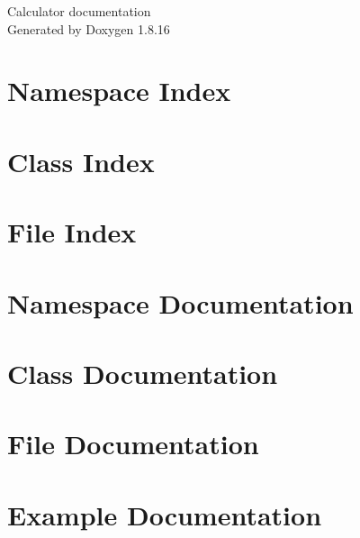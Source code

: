 \let\mypdfximage\pdfximage\def\pdfximage{\immediate\mypdfximage}\documentclass[twoside]{book}
\newcommand{\+}{\discretionary{\mbox{\scriptsize$\hookleftarrow$}}{}{}}
\newcommand{\clearemptydoublepage}{%
  \newpage{\pagestyle{empty}\cleardoublepage}%
}
\begin{document}
\hypersetup{pageanchor=false,
             bookmarksnumbered=true,
             pdfencoding=unicode
            }
\begin{titlepage}
\vspace*{7cm}
\begin{center}%
{\Large Calculator documentation }\\
\vspace*{1cm}
{\large Generated by Doxygen 1.8.16}\\
\end{center}
\end{titlepage}
\clearemptydoublepage
{}
\tableofcontents
\clearemptydoublepage
{}
\hypersetup{pageanchor=true}

\chapter{Namespace Index}

\chapter{Class Index}

\chapter{File Index}

\chapter{Namespace Documentation}

\chapter{Class Documentation}

\chapter{File Documentation}




\chapter{Example Documentation}


\backmatter
\newpage
{}
\clearemptydoublepage
{}
\printindex
\end{document}
